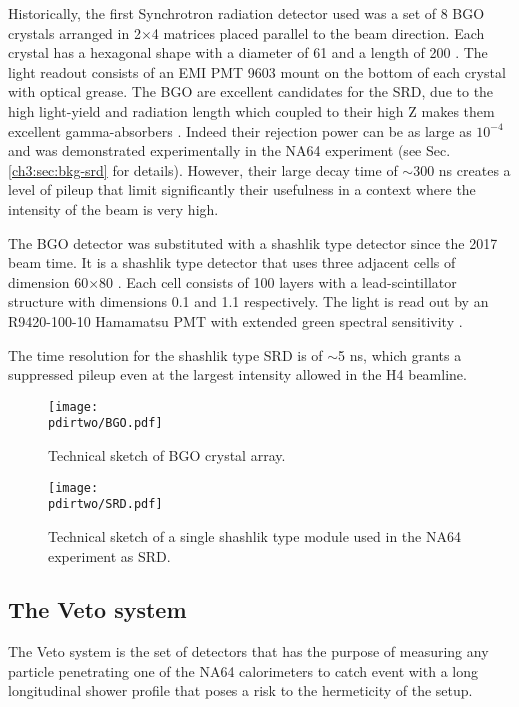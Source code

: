 Historically, the first Synchrotron radiation detector used was a set of 8 BGO crystals arranged in 2$\times$4 matrices placed parallel to the beam direction. Each crystal has a hexagonal shape with a diameter of 61 \mmi and a length of 200 \mmi. The light readout consists of an EMI PMT 9603 mount on the bottom of each crystal with optical grease. The BGO are excellent candidates for the SRD, due to the high light-yield and radiation length which coupled to their high Z makes them excellent gamma-absorbers \cite{bgo-crystal}. Indeed their rejection power can be as large as $10^{-4}$ and was demonstrated experimentally in the NA64 experiment (see Sec.\ref{ch3:sec:bkg-srd} for details). However, their large decay time of $\sim$300 \si{ns} creates a level of pileup that limit significantly their usefulness in a context where the intensity of the beam is very high.

The BGO detector was substituted with a shashlik type detector since the 2017 beam time. It is a shashlik type detector that uses three adjacent cells of dimension 60$\times$80 \mmi. Each cell consists of 100 layers with a lead-scintillator structure with dimensions 0.1 \mmi and 1.1 \mmi respectively. The light is read out by an R9420-100-10 Hamamatsu PMT with extended green spectral sensitivity \cite{hamamatsu-R9420-100-10}.

The time resolution for the shashlik type SRD is of $\sim$5 \si{ns}, which grants a suppressed pileup even at the largest intensity allowed in the H4 beamline.

\begin{figure}[bth!]
\centering
\texttt{[image: \\pdirtwo/BGO.pdf]}
\caption[BGO sketch]{Technical sketch of BGO crystal array.}
\label{fig:bgo-sketch}
\end{figure}

\begin{figure}[bth!]
\centering
\texttt{[image: \\pdirtwo/SRD.pdf]}
\caption[SRD sketch]{Technical sketch of a single shashlik type module used in the NA64 experiment as SRD.}
\label{fig:srd-sketch}
\end{figure}

\subsection{The Veto system}
\label{ch2:sec:detectors-veto}

The Veto system is the set of detectors that has the purpose of measuring any particle penetrating one of the NA64 calorimeters to catch event with a long longitudinal shower profile that poses a risk to the hermeticity of the setup.

